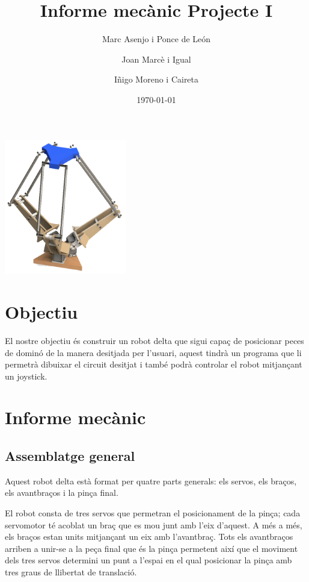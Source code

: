 \documentclass[a4paper, 12pt]{article}
\begin{document}
\title{Informe mecànic Projecte I}
\author{Marc Asenjo i Ponce de León \and
		Joan Marcè i Igual \and
		Iñigo Moreno i Caireta}
\date{\today}
\maketitle
\begin{center}
\includegraphics[width=0.4\textwidth]{./imgComp/logo}
\end{center}

\newpage
\tableofcontents{}

\newpage
\section{Objectiu}
El nostre objectiu és construir un robot delta que sigui capaç de posicionar peces de dominó de la manera desitjada per l'usuari, aquest tindrà un programa que li permetrà dibuixar el circuit desitjat i també podrà controlar el robot mitjançant un joystick.

\newpage
\section{Informe mecànic}
\subsection{Assemblatge general}

Aquest robot delta està format per quatre parts generals: els servos, els braços, els avantbraços i la pinça final. 

El robot consta de tres servos que permetran el posicionament de la pinça; cada servomotor té acoblat un braç que es mou junt amb l'eix d'aquest. A més a més, els
braços estan units mitjançant un eix amb l'avantbraç. Tots els avantbraços arriben a unir-se a la peça final que és la pinça permetent així que el moviment dels tres servos determini un punt a l'espai en el qual posicionar la pinça amb tres graus de llibertat de translació.
\end{document}
